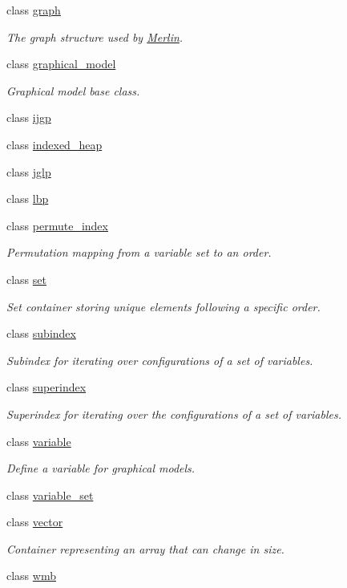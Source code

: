 \begin{DoxyCompactItemize}
class \hyperlink{classmerlin_1_1graph}{graph}
\begin{DoxyCompactList}\small\item\em The graph structure used by \hyperlink{classMerlin}{Merlin}. \end{DoxyCompactList}\item 
class \hyperlink{classmerlin_1_1graphical__model}{graphical\+\_\+model}
\begin{DoxyCompactList}\small\item\em Graphical model base class. \end{DoxyCompactList}\item 
class \hyperlink{classmerlin_1_1ijgp}{ijgp}
\item 
class \hyperlink{classmerlin_1_1indexed__heap}{indexed\+\_\+heap}
\item 
class \hyperlink{classmerlin_1_1jglp}{jglp}
\item 
class \hyperlink{classmerlin_1_1lbp}{lbp}
\item 
class \hyperlink{classmerlin_1_1permute__index}{permute\+\_\+index}
\begin{DoxyCompactList}\small\item\em Permutation mapping from a variable set to an order. \end{DoxyCompactList}\item 
class \hyperlink{classmerlin_1_1set}{set}
\begin{DoxyCompactList}\small\item\em Set container storing unique elements following a specific order. \end{DoxyCompactList}\item 
class \hyperlink{classmerlin_1_1subindex}{subindex}
\begin{DoxyCompactList}\small\item\em Subindex for iterating over configurations of a set of variables. \end{DoxyCompactList}\item 
class \hyperlink{classmerlin_1_1superindex}{superindex}
\begin{DoxyCompactList}\small\item\em Superindex for iterating over the configurations of a set of variables. \end{DoxyCompactList}\item 
class \hyperlink{classmerlin_1_1variable}{variable}
\begin{DoxyCompactList}\small\item\em Define a variable for graphical models. \end{DoxyCompactList}\item 
class \hyperlink{classmerlin_1_1variable__set}{variable\+\_\+set}
\item 
class \hyperlink{classmerlin_1_1vector}{vector}
\begin{DoxyCompactList}\small\item\em Container representing an array that can change in size. \end{DoxyCompactList}\item 
class \hyperlink{classmerlin_1_1wmb}{wmb}
\end{DoxyCompactItemize}
